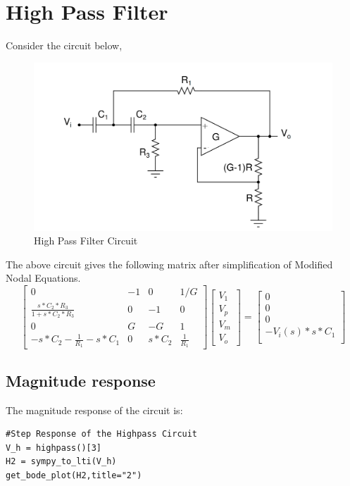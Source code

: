 \documentclass{article}
\begin{document}
\section*{High Pass Filter}
Consider the circuit below,
\begin{figure}[!tbh]
   	\centering
   	\includegraphics[scale=0.1]{plots/high_pass.png}   
   	\caption{High Pass Filter Circuit}
   	\label{fig:Figure_3}
   \end{figure}
The above circuit gives the following matrix after simplification of Modified Nodal Equations.
\begin{equation*}
    \begin{bmatrix}
    0   & -1 & 0  & 1/G \\
    \frac{s*C_2*R_3}{1+s*C_2*R_3}  & 0 & -1 & 0\\
    0  & G & -G & 1 \\
    -s*C_2 - \frac{1}{R_1} - s*C_1 & 0 & s*C_2 & \frac{1}{R_1}
\end{bmatrix}
\begin{bmatrix}
    V_1\\
    V_p\\
    V_m \\
    V_o
\end{bmatrix}
=
\begin{bmatrix}
    0 \\
    0 \\
    0 \\
    -V_i(s)*s*C_1 \\
    
\end{bmatrix}
\end{equation*}

\subsection*{Magnitude response}
The magnitude response of the circuit is:
\\
\begin{lstlisting}
#Step Response of the Highpass Circuit
V_h = highpass()[3]
H2 = sympy_to_lti(V_h)
get_bode_plot(H2,title="2")
\end{lstlisting}
\end{document}
